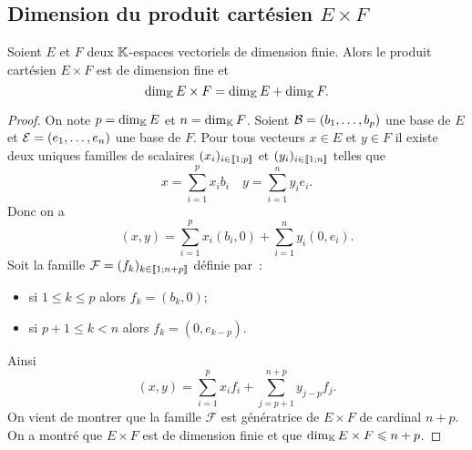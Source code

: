\subsection{Dimension du produit cartésien $E \times F$}

\begin{theo}
  Soient $E$ et $F$ deux $\mathbb{K}$-espaces vectoriels de dimension finie. Alors le produit cartésien $E \times F$ est de dimension fine et
  \begin{equation}
    \operatorname{dim}_{\mathbb{K}} E \times F = \operatorname{dim}_{\mathbb{K}} E + \operatorname{dim}_{\mathbb{K}} F.
  \end{equation}
\end{theo}
\begin{proof}
On note $p=\operatorname{dim}_{\mathbb{K}} E$ et $n=\operatorname{dim}_{\mathbb{K}} F$. Soient $\mathcal{B}=(b_1,\ldots, b_p)$ une base de $E$ et $\mathcal{E}=(e_1, \ldots, e_n)$ une base de $F$. Pour tous vecteurs $x \in E$ et $y \in F$ il existe deux uniques familles de scalaires $(x_i)_{i \in \mathopen{\llbracket}1\mathclose{}\mathpunct{};p\mathclose{\rrbracket}}$ et $(y_i)_{i \in \mathopen{\llbracket}1\mathclose{}\mathpunct{};n\mathclose{\rrbracket}}$ telles que
    \begin{equation}
      x = \sum_{i=1}^p x_i b_i \quad y = \sum_{i=1}^n y_i e_i.
    \end{equation}
    Donc on a
    \begin{equation}
      (x,y) = \sum_{i=1}^p x_i (b_i,0) + \sum_{i=1}^n y_i (0,e_i).
    \end{equation}
Soit la famille $\mathcal{F}=(f_k)_{k \in \mathopen{\llbracket}1\mathclose{}\mathpunct{};n+p\mathclose{\rrbracket}}$ définie par~:
\begin{itemize}
\item si $1 \leqslant k \leqslant p$ alors $f_k=(b_k,0)$;
\item si $p+1 \leqslant k < n$ alors $f_k=(0,e_{k-p})$.
\end{itemize}
Ainsi
\begin{equation}
  (x,y)=\sum_{i=1}^p x_i f_i + \sum_{j=p+1}^{n+p} y_{j-p} f_j.
\end{equation}
On vient de montrer que la famille $\mathcal{F}$ est génératrice de $E \times F$ de cardinal $n+p$. On a montré que $E \times F$ est de dimension finie et que $\operatorname{dim}_{\mathbb{K}} E\times F \leqslant n+p$. 


\end{proof}
